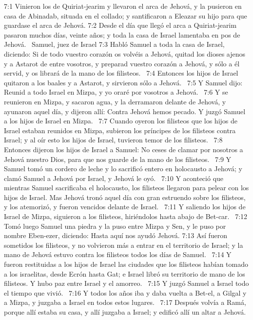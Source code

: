 7:1 Vinieron los de Quiriat-jearim y llevaron el arca de Jehová, y la pusieron en casa de Abinadab, situada en el collado; y santificaron a Eleazar su hijo para que guardase el arca de Jehová. 
7:2 Desde el día que llegó el arca a Quiriat-jearim pasaron muchos días, veinte años; y toda la casa de Israel lamentaba en pos de Jehová.  
Samuel, juez de Israel 
7:3 Habló Samuel a toda la casa de Israel, diciendo: Si de todo vuestro corazón os volvéis a Jehová, quitad los dioses ajenos y a Astarot de entre vosotros, y preparad vuestro corazón a Jehová, y sólo a él servid, y os librará de la mano de los filisteos.  
7:4 Entonces los hijos de Israel quitaron a los baales y a Astarot, y sirvieron sólo a Jehová.  
7:5 Y Samuel dijo: Reunid a todo Israel en Mizpa, y yo oraré por vosotros a Jehová.  
7:6 Y se reunieron en Mizpa, y sacaron agua, y la derramaron delante de Jehová, y ayunaron aquel día, y dijeron allí: Contra Jehová hemos pecado. Y juzgó Samuel a los hijos de Israel en Mizpa.  
7:7 Cuando oyeron los filisteos que los hijos de Israel estaban reunidos en Mizpa, subieron los príncipes de los filisteos contra Israel; y al oír esto los hijos de Israel, tuvieron temor de los filisteos.  
7:8 Entonces dijeron los hijos de Israel a Samuel: No ceses de clamar por nosotros a Jehová nuestro Dios, para que nos guarde de la mano de los filisteos.  
7:9 Y Samuel tomó un cordero de leche y lo sacrificó entero en holocausto a Jehová; y clamó Samuel a Jehová por Israel, y Jehová le oyó.  
7:10 Y aconteció que mientras Samuel sacrificaba el holocausto, los filisteos llegaron para pelear con los hijos de Israel. Mas Jehová tronó aquel día con gran estruendo sobre los filisteos, y los atemorizó, y fueron vencidos delante de Israel.  
7:11 Y saliendo los hijos de Israel de Mizpa, siguieron a los filisteos, hiriéndolos hasta abajo de Bet-car.  
7:12 Tomó luego Samuel una piedra y la puso entre Mizpa y Sen, y le puso por nombre Eben-ezer, diciendo: Hasta aquí nos ayudó Jehová. 
7:13 Así fueron sometidos los filisteos, y no volvieron más a entrar en el territorio de Israel; y la mano de Jehová estuvo contra los filisteos todos los días de Samuel.  
7:14 Y fueron restituidas a los hijos de Israel las ciudades que los filisteos habían tomado a los israelitas, desde Ecrón hasta Gat; e Israel libró su territorio de mano de los filisteos. Y hubo paz entre Israel y el amorreo.  
7:15 Y juzgó Samuel a Israel todo el tiempo que vivió.  
7:16 Y todos los años iba y daba vuelta a Bet-el, a Gilgal y a Mizpa, y juzgaba a Israel en todos estos lugares.  
7:17 Después volvía a Ramá, porque allí estaba su casa, y allí juzgaba a Israel; y edificó allí un altar a Jehová.  
